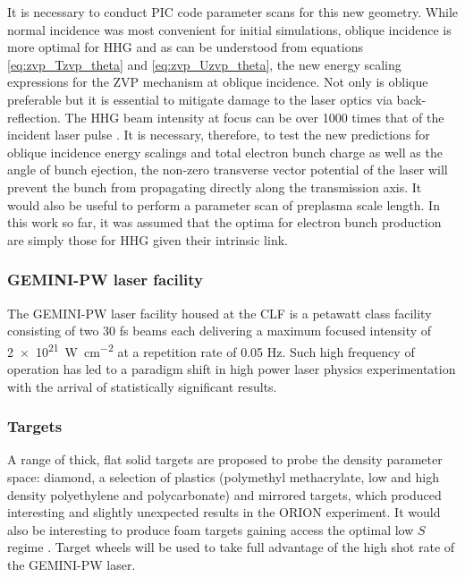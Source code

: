 It is necessary to conduct PIC code parameter scans for this new geometry. While normal incidence was most convenient for initial simulations, oblique incidence is more optimal for \ac{HHG} \cite{gonoskovUltrarelativisticNanoplasmonicsRoute2011, edwardsXRayEmissionEffectiveness2020} and as can be understood from equations \ref{eq:zvp_Tzvp_theta} and \ref{eq:zvp_Uzvp_theta}, the new energy scaling expressions for the ZVP mechanism at oblique incidence. Not only is oblique preferable but it is essential to mitigate damage to the laser optics via back-reflection. The \ac{HHG} beam intensity at focus can be over 1000 times that of the incident laser pulse \cite{quereReflectingPetawattLasers2021}. It is necessary, therefore, to test the new predictions for oblique incidence energy scalings and total electron bunch charge as well as the angle of bunch ejection, the non-zero transverse vector potential of the laser will prevent the bunch from propagating directly along the transmission axis. It would also be useful to perform a parameter scan of preplasma scale length. In this work so far, it was assumed that the optima for electron bunch production are simply those for \ac{HHG} given their intrinsic link.

\subsubsection{GEMINI-PW laser facility}
The GEMINI-PW laser facility housed at the \ac{CLF} is a petawatt class facility consisting of two 30 fs beams each delivering a maximum focused intensity of \qty{2e21}{W.cm^{-2}} at a repetition rate of 0.05 Hz. Such high frequency of operation has led to a paradigm shift in high power laser physics experimentation with the arrival of statistically significant results.


\subsubsection{Targets}
A range of thick, flat solid targets are proposed to probe the density parameter space: diamond, a selection of plastics (polymethyl methacrylate, low and high density polyethylene and polycarbonate) and mirrored targets, which produced interesting and slightly unexpected results in the ORION experiment. It would also be interesting to produce foam targets gaining access the optimal low $S$ regime \cite{bataniPhysicsIssuesShock2014}. Target wheels will be used to take full advantage of the high shot rate of the GEMINI-PW laser.


